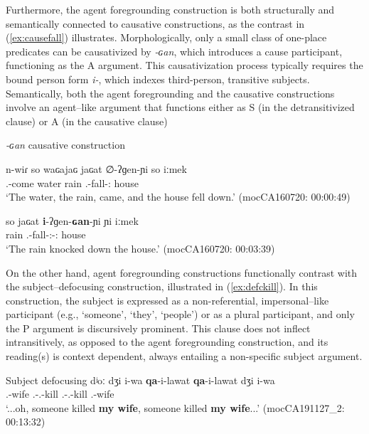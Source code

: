 \documentclass[12pt]{article}
\begin{document}
Furthermore, the agent foregrounding construction is both structurally and semantically connected to causative constructions, as the contrast in  (\ref{ex:causefall}) illustrates. Morphologically, only a small class of one-place predicates can be causativized by \textit{-ɢan}, which introduces a cause participant, functioning as the A argument. This causativization process typically requires the bound person form \textit{i-}, which indexes third-person, transitive subjects. Semantically, both the agent foregrounding and the causative constructions involve an agent--like argument that functions either as S (in the detransitivized clause) or A (in the causative clause) \citep[see][Ch.4]{juarez2023}   
\newpage
\begin{exe}
\ex  \textit{-ɢan} causative construction \label{ex:causefall}
\begin{xlist}
\ex
\gll n-wiɾ so waɢajaɢ jaɢat ∅-ʔɡen-ɲi so iːmek \\
{\Third.\III}-come {\DetTwo} water rain {\Third.\II}-fall-{\Dir:\Down} {\DetTwo} house\\
\trans `The water, the rain, came, and the house fell down.'
 \hfill  (mocCA160720: 00:00:49)\label{ex:causefalla}


\ex
\gll so jaɢat \textbf{i}-ʔɡen-\textbf{ɢan}-ɲi ɲi iːmek\\
{\DetTwo} rain  {\Third.\II}-fall-{\Vm:\Tr}-{\Dir:\Down} {\DetSix} house\\
\trans `The rain knocked down the house.'
\hfill{ (mocCA160720: 00:03:39)} \label{ex:causefallb}

\end{xlist}
\end{exe}

On the other hand, agent foregrounding constructions functionally contrast with the subject--defocusing construction, illustrated in (\ref{ex:defckill}). In this construction, the subject is expressed as a non-referential, impersonal--like participant (e.g., `someone', `they', `people') or as a  plural participant,  and only the P argument is discursively prominent. This clause does not inflect intransitively, as opposed to the agent foregrounding construction,  and its reading(s) is context dependent, always entailing a non-specific subject argument.

\begin{exe}
\ex Subject defocusing
	 \gll dʲoː dʒi i-wa \textbf{qa}-i-lawat \textbf{qa}-i-lawat dʒi i-wa \\
			       {\Exclam} {\DetFive} {\First\Sg.\Poss}-wife {\Sbj.\Defc}-{\Third.\II}-kill {\Sbj.\Defc}-{\Third.\II}-kill {\DetFive} {\First\Sg.\Poss}-wife\\
	\trans `...oh, someone killed \textbf{my wife}, someone  killed \textbf{my wife}...' \trans\hfill (mocCA191127\_2: 00:13:32)\label{ex:defckill}
\end{exe}
\end{document}
